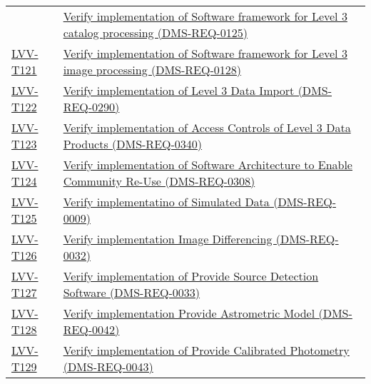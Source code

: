 \begin{longtable}[]{p{3cm}p{13cm}}
&
\href{https://jira.lsstcorp.org/secure/Tests.jspa\#/testCase/LVV-T120}{Verify
implementation of Software framework for Level 3 catalog processing
(DMS-REQ-0125)}\tabularnewline
\protect\hyperlink{lvv-t121---verify-implementation-of-software-framework-for-level-3-image-processing-dms-req-0128}{LVV-T121}
&
\href{https://jira.lsstcorp.org/secure/Tests.jspa\#/testCase/LVV-T121}{Verify
implementation of Software framework for Level 3 image processing
(DMS-REQ-0128)}\tabularnewline
\protect\hyperlink{lvv-t122---verify-implementation-of-level-3-data-import-dms-req-0290}{LVV-T122}
&
\href{https://jira.lsstcorp.org/secure/Tests.jspa\#/testCase/LVV-T122}{Verify
implementation of Level 3 Data Import (DMS-REQ-0290)}\tabularnewline
\protect\hyperlink{lvv-t123---verify-implementation-of-access-controls-of-level-3-data-products-dms-req-0340}{LVV-T123}
&
\href{https://jira.lsstcorp.org/secure/Tests.jspa\#/testCase/LVV-T123}{Verify
implementation of Access Controls of Level 3 Data Products
(DMS-REQ-0340)}\tabularnewline
\protect\hyperlink{lvv-t124---verify-implementation-of--software-architecture-to-enable-community-re-use-dms-req-0308}{LVV-T124}
&
\href{https://jira.lsstcorp.org/secure/Tests.jspa\#/testCase/LVV-T124}{Verify
implementation of Software Architecture to Enable Community Re-Use
(DMS-REQ-0308)}\tabularnewline
\protect\hyperlink{lvv-t125---verify-implementatino-of--simulated-data-dms-req-0009}{LVV-T125}
&
\href{https://jira.lsstcorp.org/secure/Tests.jspa\#/testCase/LVV-T125}{Verify
implementatino of Simulated Data (DMS-REQ-0009)}\tabularnewline
\protect\hyperlink{lvv-t126---verify-implementation--image-differencing-dms-req-0032}{LVV-T126}
&
\href{https://jira.lsstcorp.org/secure/Tests.jspa\#/testCase/LVV-T126}{Verify
implementation Image Differencing (DMS-REQ-0032)}\tabularnewline
\protect\hyperlink{lvv-t127---verify-implementation-of-provide-source-detection-software-dms-req-0033}{LVV-T127}
&
\href{https://jira.lsstcorp.org/secure/Tests.jspa\#/testCase/LVV-T127}{Verify
implementation of Provide Source Detection Software
(DMS-REQ-0033)}\tabularnewline
\protect\hyperlink{lvv-t128---verify-implementation-provide-astrometric-model-dms-req-0042}{LVV-T128}
&
\href{https://jira.lsstcorp.org/secure/Tests.jspa\#/testCase/LVV-T128}{Verify
implementation Provide Astrometric Model (DMS-REQ-0042)}\tabularnewline
\protect\hyperlink{lvv-t129---verify-implementation-of-provide-calibrated-photometry-dms-req-0043}{LVV-T129}
&
\href{https://jira.lsstcorp.org/secure/Tests.jspa\#/testCase/LVV-T129}{Verify
implementation of Provide Calibrated Photometry
(DMS-REQ-0043)}\tabularnewline

\end{longtable}
